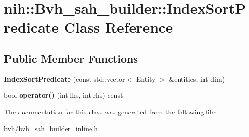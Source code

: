\hypertarget{classnih_1_1_bvh__sah__builder_1_1_index_sort_predicate}{
\section{nih\-:\-:\-Bvh\-\_\-sah\-\_\-builder\-:\-:\-Index\-Sort\-Predicate \-Class \-Reference}
\label{classnih_1_1_bvh__sah__builder_1_1_index_sort_predicate}
}
\subsection*{\-Public \-Member \-Functions}
\begin{DoxyCompactItemize}
\item 
\hypertarget{classnih_1_1_bvh__sah__builder_1_1_index_sort_predicate_abf33cce16216d1e829c1080a9b9361ca}{
{\bfseries \-Index\-Sort\-Predicate} (const std\-::vector$<$ \-Entity $>$ \&entities, int dim)}
\label{classnih_1_1_bvh__sah__builder_1_1_index_sort_predicate_abf33cce16216d1e829c1080a9b9361ca}

\item 
\hypertarget{classnih_1_1_bvh__sah__builder_1_1_index_sort_predicate_a959f516bc6bda99bf356fa9f70442baa}{
bool {\bfseries operator()} (int lhs, int rhs) const }
\label{classnih_1_1_bvh__sah__builder_1_1_index_sort_predicate_a959f516bc6bda99bf356fa9f70442baa}

\end{DoxyCompactItemize}


\-The documentation for this class was generated from the following file\-:\begin{DoxyCompactItemize}
\item 
bvh/bvh\-\_\-sah\-\_\-builder\-\_\-inline.\-h\end{DoxyCompactItemize}

